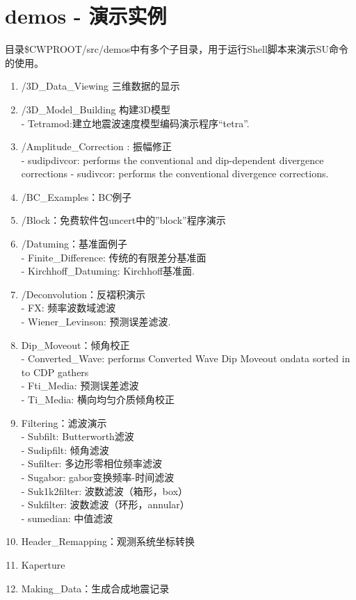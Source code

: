 \chapter{demos - 演示实例}
目录\$CWPROOT/src/demos中有多个子目录，用于运行Shell脚本来演示SU命令的使用。
\begin{enumerate}
	\item /3D\_Data\_Viewing 三维数据的显示
	\item /3D\_Model\_Building 构建3D模型\\
	- Tetramod:建立地震波速度模型编码演示程序“tetra”.	
	\item  /Amplitude\_Correction : 振幅修正\\
	- sudipdivcor: performs the conventional and dip-dependent divergence corrections
	- sudivcor: performs the conventional divergence corrections.
	\item  /BC\_Examples：BC例子
	\item  /Block：免费软件包uncert中的”block”程序演示
	\item  /Datuming：基准面例子\\	
	- Finite\_Difference: 传统的有限差分基准面\\
	- Kirchhoff\_Datuming: Kirchhoff基准面.
	\item  /Deconvolution：反褶积演示\\
	- FX: 频率波数域滤波\\
	- Wiener\_Levinson: 预测误差滤波.
	\item  Dip\_Moveout：倾角校正\\
	- Converted\_Wave: performs  Converted Wave Dip Moveout ondata sorted in to CDP gathers\\
	- Fti\_Media: 预测误差滤波\\
	- Ti\_Media: 横向均匀介质倾角校正
	\item  Filtering：滤波演示\\
	- Subfilt: Butterworth滤波\\
	- Sudipfilt: 倾角滤波\\
	- Sufilter: 多边形零相位频率滤波\\
	- Sugabor: gabor变换频率-时间滤波\\
	- Suk1k2filter: 波数滤波（箱形，box）\\
	- Sukfilter: 波数滤波（环形，annular）\\
	- sumedian: 中值滤波
	\item  Header\_Remapping：观测系统坐标转换
	\item  Kaperture
	\item  Making\_Data：生成合成地震记录\\

\end{enumerate}
